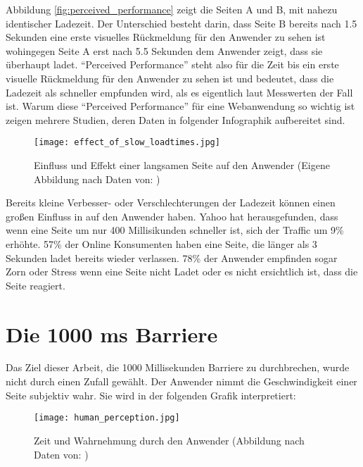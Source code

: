 			Abbildung \ref{fig:perceived_performance} zeigt die Seiten A und B, mit nahezu identischer Ladezeit. Der Unterschied besteht darin, dass Seite B bereits nach 1.5 Sekunden eine erste visuelles Rückmeldung für den Anwender zu sehen ist wohingegen Seite A erst nach 5.5 Sekunden dem Anwender zeigt, dass sie überhaupt ladet.
			"`Perceived Performance"' steht also für die Zeit bis ein erste visuelle Rückmeldung für den Anwender zu sehen ist und bedeutet, dass die Ladezeit als schneller empfunden wird, als es eigentlich laut Messwerten der Fall ist. Warum diese "`Perceived Performance"' für eine Webanwendung so wichtig ist zeigen mehrere Studien, deren Daten in folgender Infographik aufbereitet sind.

			\begin{figure}[htbp]
				\begin{center}
					\texttt{[image: effect\_of\_slow\_loadtimes.jpg]}
					\caption{Einfluss und Effekt einer langsamen Seite auf den Anwender (Eigene Abbildung nach Daten von: \autocite[p. 8]{radware14})}
					\label{fig:effect_of_slow_loadtimes}
				\end{center}
			\end{figure}

			Bereits kleine Verbesser- oder Verschlechterungen der Ladezeit können einen großen Einfluss in auf den Anwender haben. Yahoo hat herausgefunden, dass wenn eine Seite um nur 400 Millisikunden schneller ist, sich der Traffic um 9\% erhöhte.\autocite{stefanov08} 57\% der Online Konsumenten haben eine Seite, die länger als 3 Sekunden ladet bereits wieder verlassen. 78\% der Anwender empfinden sogar Zorn oder Stress wenn eine Seite nicht Ladet oder es nicht ersichtlich ist, dass die Seite reagiert.

\pagebreak


\section{Die 1000 ms Barriere} %
\label{sec:die_1000_ms_barriere}
	Das Ziel dieser Arbeit, die 1000 Millisekunden Barriere zu durchbrechen, wurde nicht durch einen Zufall gewählt. Der Anwender nimmt die Geschwindigkeit einer Seite subjektiv wahr. Sie wird in der folgenden Grafik interpretiert:

	\begin{figure}[htbp]
		\begin{center}
			\texttt{[image: human\_perception.jpg]}
			\caption{Zeit und Wahrnehmung durch den Anwender (Abbildung nach Daten von: \autocite{grigorikHumanPerception})}
			\label{fig:human_perception}
		\end{center}
	\end{figure}

